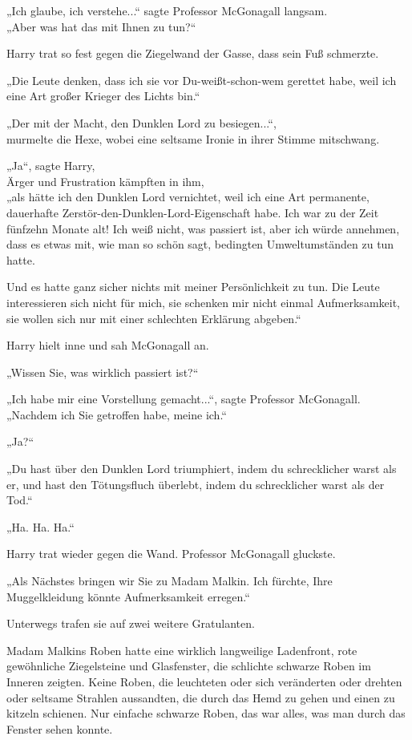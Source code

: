 {„Ich glaube, ich verstehe...“ sagte Professor McGonagall langsam.\\ „Aber was hat das mit Ihnen zu tun?“

Harry trat so fest gegen die Ziegelwand der Gasse, dass sein Fuß schmerzte.

„Die Leute denken, dass ich sie vor Du-weißt-schon-wem gerettet habe, weil ich eine Art großer Krieger des Lichts bin.“

„Der mit der Macht, den Dunklen Lord zu besiegen...“,\\ murmelte die Hexe, wobei eine seltsame Ironie in ihrer Stimme mitschwang.

„Ja“, sagte Harry,\\ Ärger und Frustration kämpften in ihm,\\ „als hätte ich den Dunklen Lord vernichtet, weil ich eine Art permanente, dauerhafte Zerstör-den-Dunklen-Lord-Eigenschaft habe. Ich war zu der Zeit fünfzehn Monate alt! Ich weiß nicht, was passiert ist, aber ich würde annehmen, dass es etwas mit, wie man so schön sagt, bedingten Umweltumständen zu tun hatte.

Und es hatte ganz sicher nichts mit meiner Persönlichkeit zu tun. Die Leute interessieren sich nicht für mich, sie schenken mir nicht einmal Aufmerksamkeit, sie wollen sich nur mit einer schlechten Erklärung abgeben.“

Harry hielt inne und sah McGonagall an.

„Wissen Sie, was wirklich passiert ist?“

„Ich habe mir eine Vorstellung gemacht...“, sagte Professor McGonagall. „Nachdem ich Sie getroffen habe, meine ich.“

„Ja?“

„Du hast über den Dunklen Lord triumphiert, indem du schrecklicher warst als er, und hast den Tötungsfluch überlebt, indem du schrecklicher warst als der Tod.“

„Ha. Ha. Ha.“

Harry trat wieder gegen die Wand. Professor McGonagall gluckste.

„Als Nächstes bringen wir Sie zu Madam Malkin. Ich fürchte, Ihre Muggelkleidung könnte Aufmerksamkeit erregen.“

Unterwegs trafen sie auf zwei weitere Gratulanten.

Madam Malkins Roben hatte eine wirklich langweilige Ladenfront, rote gewöhnliche Ziegelsteine und Glasfenster, die schlichte schwarze Roben im Inneren zeigten. Keine Roben, die leuchteten oder sich veränderten oder drehten oder seltsame Strahlen aussandten, die durch das Hemd zu gehen und einen zu kitzeln schienen. Nur einfache schwarze Roben, das war alles, was man durch das Fenster sehen konnte.

}
